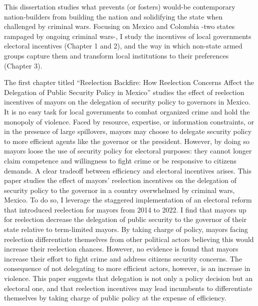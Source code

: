 
This dissertation studies what prevents (or fosters) would-be contemporary nation-builders from building the nation and solidifying the state when challenged by criminal wars. Focusing on Mexico and Colombia -two states rampaged by ongoing criminal wars-, I study the incentives of local governments electoral incentives (Chapter 1 and 2), and the way in which non-state armed groups capture them and transform local institutions to their preferences (Chapter 3). 

The first chapter titled ``Reelection Backfire: How Reelection Concerns Affect the Delegation of Public Security Policy in Mexico'' studies the effect of reelection incentives of mayors on the delegation of security policy to governors in Mexico. It is no easy task for local governments to combat organized crime and hold the monopoly of violence. Faced by resource, expertise, or information constraints, or in the presence of large spillovers, mayors may choose to delegate security policy to more efficient agents like the governor or the president. However, by doing so mayors loose the use of security policy for electoral purposes: they cannot longer claim competence and willingness to fight crime or be responsive to citizens demands. A clear tradeoff between efficiency and electoral incentives arises. This paper studies the effect of mayors' reelection incentives on the delegation of security policy to the governor in a country overwhelmed by criminal wars, Mexico. To do so, I leverage the staggered implementation of an electoral reform that introduced reelection for mayors from 2014 to 2022. I find that mayors up for reelection decrease the delegation of public security to the governor of their state relative to term-limited mayors. By taking charge of policy, mayors facing reelection differentiate themselves from other political actors believing this would increase their reelection chances. However, no evidence is found that mayors increase their effort to fight crime and address citizens security concerns. The consequence of not delegating to more efficient actors, however, is an increase in violence. This paper suggests that delegation is not only a policy decision but an electoral one, and that reelection incentives may lead incumbents to differentiate themselves by taking charge of public policy at the expense of efficiency.   

